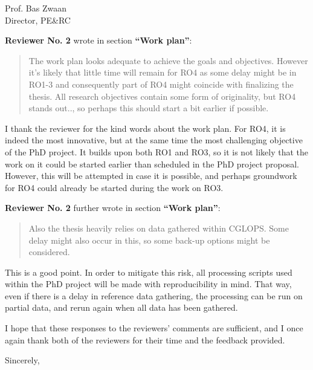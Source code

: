 \documentclass[a4paper,10pt,backaddress=false]{scrartcl}
\begin{document}
\begin{letter}{Prof. Bas Zwaan \\ Director, PE\&RC}
\bigskip

\textbf{Reviewer No. 2} wrote in section \textbf{``Work plan''}:

\blockquote{The work plan looks adequate to achieve the goals and objectives. However it’s likely that little time will remain for RO4 as some delay might be in RO1-3 and consequently part of RO4 might coincide with finalizing the thesis. All research objectives contain some form of originality, but RO4 stands out.., so perhaps this should start a bit earlier if possible.}

I thank the reviewer for the kind words about the work plan. For RO4, it is indeed the most innovative, but at the same time the most challenging objective of the PhD project. It builds upon both RO1 and RO3, so it is not likely that the work on it could be started earlier than scheduled in the PhD project proposal. However, this will be attempted in case it is possible, and perhaps groundwork for RO4 could already be started during the work on RO3.

\bigskip

\textbf{Reviewer No. 2} further wrote in section \textbf{``Work plan''}:

\blockquote{Also the thesis heavily relies on data gathered within CGLOPS. Some delay might also occur in this, so some back-up options might be considered.}

This is a good point. In order to mitigate this risk, all processing scripts used within the PhD project will be made with reproducibility in mind. That way, even if there is a delay in reference data gathering, the processing can be run on partial data, and rerun again when all data has been gathered.



\bigskip

I hope that these responses to the reviewers' comments are sufficient, and I once again thank both of the reviewers for their time and the feedback provided.

\closing{Sincerely,}

\end{letter}
\end{document}
